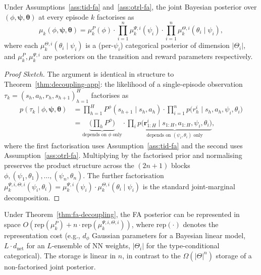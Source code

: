 \begin{theorem}[FA Decoupling]
\label{thm:fa-decoupling}
Under Assumptions~\ref{ass:tid-fa} and~\ref{ass:otrl-fa}, the joint Bayesian posterior over $(\phi, \boldsymbol{\psi}, \boldsymbol{\theta})$ at every episode $k$ factorises as
\begin{equation}
\mu_k(\phi, \boldsymbol{\psi}, \boldsymbol{\theta}) = \mu_k^P(\phi) \cdot \prod_{i=1}^n \mu_k^{\Psi, i}(\psi_i) \cdot \prod_{i=1}^n \mu_k^{\Theta, i}(\theta_i \mid \psi_i),
\end{equation}
where each $\mu_k^{\Theta, i}(\theta_i \mid \psi_i)$ is a (per-$\psi_i$) categorical posterior of dimension $|\Theta_i|$, and $\mu_k^P, \mu_k^{\Psi, i}$ are posteriors on the transition and reward parameters respectively.
\end{theorem}

\begin{proof}[Proof Sketch]
The argument is identical in structure to Theorem~\ref{thm:decoupling-app}: the likelihood of a single-episode observation $\tau_k = (s_h, a_h, r_h, s_{h+1})_{h=1}^H$ factorises as
\begin{align}
p(\tau_k \mid \phi, \boldsymbol{\psi}, \boldsymbol{\theta}) &= \prod_{h=1}^H P^\phi(s_{h+1} \mid s_h, a_h) \cdot \prod_{i=1}^n p\big(r_h^i \mid s_h, a_h, \psi_i, \theta_i\big) \\
&= \underbrace{\Big(\prod_h P^\phi\big)}_{\text{depends on } \phi \text{ only}} \cdot \prod_i \underbrace{p\big(\boldsymbol{r}^i_{1:H} \mid s_{1:H}, a_{1:H}, \psi_i, \theta_i\big)}_{\text{depends on } (\psi_i, \theta_i) \text{ only}},
\end{align}
where the first factorisation uses Assumption~\ref{ass:tid-fa} and the second uses Assumption~\ref{ass:otrl-fa}. Multiplying by the factorised prior and normalising preserves the product structure across the $(2n+1)$ blocks $\phi, (\psi_1, \theta_1), \ldots, (\psi_n, \theta_n)$. The further factorisation $\mu_k^{\Psi, i, \Theta, i}(\psi_i, \theta_i) = \mu_k^{\Psi, i}(\psi_i) \cdot \mu_k^{\Theta, i}(\theta_i \mid \psi_i)$ is the standard joint-marginal decomposition.
\end{proof}

\begin{corollary}[FA Storage]
\label{cor:fa-storage}
Under Theorem~\ref{thm:fa-decoupling}, the FA posterior can be represented in space $O(\mathrm{rep}(\mu_k^P) + n \cdot \mathrm{rep}(\mu_k^{\Psi, i, \Theta, i}))$, where $\mathrm{rep}(\cdot)$ denotes the representation cost (e.g., $d_\phi$ Gaussian parameters for a Bayesian linear model, $L \cdot d_{\mathrm{net}}$ for an $L$-ensemble of NN weights, $|\Theta_i|$ for the type-conditional categorical). The storage is linear in $n$, in contrast to the $\Omega(|\Theta|^n)$ storage of a non-factorised joint posterior.
\end{corollary}

